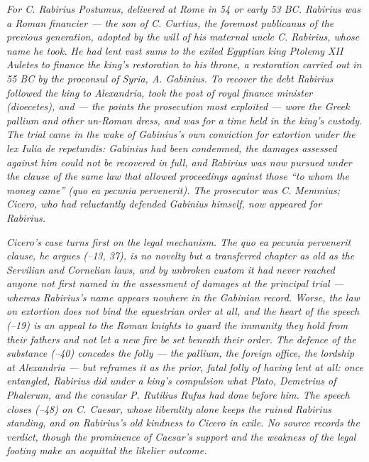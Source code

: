 
\textit{For C. Rabirius Postumus, delivered at Rome in
54 or early 53 BC. Rabirius was a Roman financier --- the
son of C. Curtius, the foremost \textit{publicanus} of the
previous generation, adopted by the will of his maternal
uncle C. Rabirius, whose name he took. He had lent vast sums to the
exiled Egyptian king Ptolemy XII Auletes to finance the
king's restoration to his throne, a restoration carried
out in 55 BC by the proconsul of Syria, A. Gabinius. To
recover the debt Rabirius followed the king to Alexandria,
took the post of royal finance minister (\textit{dioecetes}),
and --- the points the prosecution most exploited --- wore
the Greek pallium and other un-Roman dress, and was for a
time held in the king's custody. The trial came in the
wake of Gabinius's own conviction for extortion under the
lex Iulia de repetundis: Gabinius had been condemned, the
damages assessed against him could not be recovered in
full, and Rabirius was now pursued under the clause of the
same law that allowed proceedings against those ``to whom
the money came'' (\textit{quo ea pecunia pervenerit}). The
prosecutor was C. Memmius; Cicero, who had reluctantly
defended Gabinius himself, now appeared for Rabirius.}

\textit{Cicero's case turns first on the legal mechanism.
The \textit{quo ea pecunia pervenerit} clause, he argues
(--13, 37), is no novelty but a transferred
chapter as old as the Servilian and Cornelian laws, and by
unbroken custom it had never reached anyone not first named
in the assessment of damages at the principal trial ---
whereas Rabirius's name appears nowhere in the Gabinian
record. Worse, the law on extortion does not bind the
equestrian order at all, and the heart of the speech
(--19) is an appeal to the Roman knights to
guard the immunity they hold from their fathers and not let
a new fire be set beneath their order. The defence of the
substance (--40) concedes the folly --- the
pallium, the foreign office, the lordship at Alexandria ---
but reframes it as the prior, fatal folly of having lent at
all: once entangled, Rabirius did under a king's compulsion
what Plato, Demetrius of Phalerum, and the consular P.
Rutilius Rufus had done before him. The speech closes
(--48) on C. Caesar, whose liberality alone
keeps the ruined Rabirius standing, and on Rabirius's old
kindness to Cicero in exile. No source records the verdict,
though the prominence of Caesar's support and the weakness
of the legal footing make an acquittal the likelier
outcome.}
